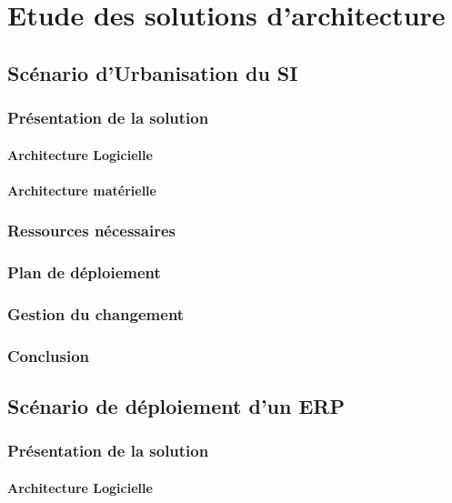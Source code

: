 \section{Etude des solutions d'architecture}

\subsection{Scénario d'Urbanisation du SI}

\subsubsection{Présentation de la solution}
\paragraph{Architecture Logicielle}

\paragraph{Architecture matérielle}

\subsubsection{Ressources nécessaires}

\subsubsection{Plan de déploiement}

\subsubsection{Gestion du changement}

\subsubsection{Conclusion}

\subsection{Scénario de déploiement d'un ERP}

\subsubsection{Présentation de la solution}
\paragraph{Architecture Logicielle}

